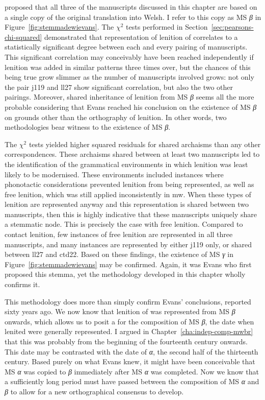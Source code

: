 \Textcite[lviii]{Eva_Welsh88} proposed that all three of the manuscripts discussed in this chapter are based on a single copy of the original translation into Welsh. I refer to this copy as MS \textit{β} in Figure~\ref{fig:stemmadewievans}. The \(\chi^2\) tests performed in Section~\ref{sec:pearsons-chi-squared} demonstrated that representation of lenition of  correlates to a statistically significant degree between each and every pairing of manuscripts. This significant correlation may conceivably have been reached independently if lenition was added in similar patterns three times over, but the chances of this being true grow slimmer as the number of manuscripts involved grows: not only the pair \gls{j119} and \gls{ll27} show significant correlation, but also the two other pairings. Moreover, shared inheritance of lenition from MS \textit{β} seems all the more probable considering that Evans reached his conclusion on the existence of MS \textit{β} on grounds other than the orthography of lenition. In other words,  two methodologies  bear witness to the existence of MS \textit{β}. 

The \(\chi^2\) tests yielded higher squared residuals for shared archaisms than any other correspondences. These archaisms shared between at least two manuscripts led to the identification of the grammatical environments in which lenition was least likely to be modernised. These environments included instances where phonotactic considerations prevented lenition from being represented, as well as free lenition, which was still applied inconsistently in \gls{mw}. When these types of lenition are represented anyway and this representation is shared between two manuscripts, then this is highly indicative that these manuscripts uniquely share a stemmatic node. This is precisely the case with free lenition. Compared to contact lenition, few instances of free lenition are represented in all three manuscripts, and many instances are represented by either \gls{j119} only, or shared between \gls{ll27} and \gls{ctd22}. Based on these findings, the existence of MS \textit{γ} in Figure~\ref{fig:stemmadewievans} may be confirmed. Again, it was Evans who first proposed this stemma, yet the methodology developed in this chapter wholly confirms it.

This methodology does more than simply confirm Evans' conclusions, reported sixty years ago. We now know  that lenition of  was represented from MS \textit{β} onwards, which allows us to posit a  for the composition of MS \textit{β}, \ie the date when lenited  were generally represented. I argued in Chapter~\ref{cha:indep-comp-mwbr} that this was probably from the beginning of the fourteenth century onwards. This date may be contrasted with the date of \textit{α}, the second half of the thirteenth century. Based purely on what Evans knew, it might have been conceivable that MS \textit{α} was copied to \textit{β} immediately after  MS \textit{α} was completed. Now we know that a sufficiently long period must have passed between the composition of MS \textit{α} and \textit{β} to allow for a new orthographical consensus to develop. 

